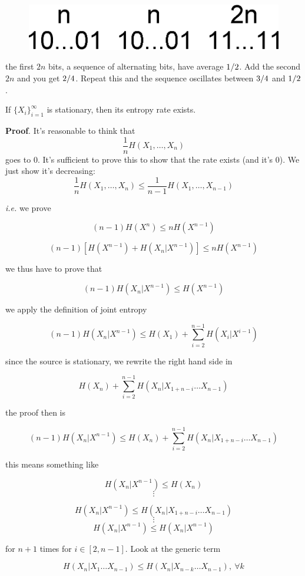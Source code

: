 \begin{figure}[h!]
\centering
	\includegraphics[width=0.3\linewidth]{pictures/ch05-seq.eps}
\end{figure}
the first $2n$ bits, a sequence of alternating bits, have average ${1}/{2}$. Add the second $2n$ and you get ${2}/{4}$. Repeat this and the sequence oscillates between ${3}/{4}$ and ${1}/{2}$.

\begin{thm}
 If $\{X_i\}_{i = 1}^\infty$ is stationary, then its entropy rate exists.
\end{thm}

\noindent\textbf{Proof}. It's reasonable to think that $$\dfrac{1}{n}H(X_1, \ldots, X_n)$$ goes to 0. It's sufficient to prove this to show that the rate exists (and it's 0). We just show it's decreasing:
\[
 \dfrac{1}{n}H(X_1, \ldots, X_n)  \leq \dfrac{1}{n-1}H(X_1, \ldots, X_{n-1}) 
\]

\emph{i.e.} we prove

\[
 (n-1)H(X^n)  \leq nH(X^{n-1}) 
\]

\[
 (n-1)[H(X^{n-1}) + H(X_n | X^{n-1})]  \leq nH(X^{n-1}) 
\]

we thus have to prove that

\[
  (n-1)H(X_n | X^{n-1})  \leq H(X^{n-1}) 
\]

we apply the definition of joint entropy

\[
 (n-1)H(X_n | X^{n-1})  \leq H(X_1) + \sum_{i=2}^{n-1}H(X_i|X^{i-1}) 
\]

since the source is stationary, we rewrite the right hand side in

\[
 H(X_n) + \sum_{i=2}^{n-1} H(X_n|X_{1 + n - i} \ldots X_{n-1})
\]

the proof then is

\[
(n-1)H(X_n|X^{n-1}) \leq H(X_n) + \sum_{i=2}^{n-1}H(X_n | X_{1+n-i} \ldots X_{n-1}) 
\]

this means something like

\[
 H(X_n|X^{n-1}) \leq H(X_n)
\]
\[
 \vdots
\]

\[
 H(X_n|X^{n-1}) \leq H(X_n | X_{1+n-i} \ldots X_{n-1}) 
\]
\[
 \vdots
\]
\[
 H(X_n|X^{n-1}) \leq H(X_n|X^{n-1})
\]

for $n+1$ times for $i \in [2, n-1]$. Look at the generic term

\[
 H(X_n|X_1 \ldots X_{n-1}) \leq H(X_n|X_{n-k}\ldots X_{n-1}),\ \forall k
\]

